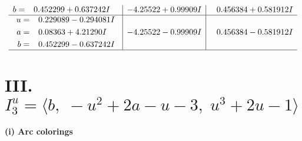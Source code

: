 \documentclass[1p]{elsarticle_modified}
\theoremstyle{definition}
\begin{document}
$$\begin{array}{c|c|c}
\begin{aligned}
b &= \phantom{-}0.452299 + 0.637242 I\end{aligned}
 & -4.25522 + 0.99909 I & \phantom{-}0.456384 + 0.581912 I \\ \hline\begin{aligned}
u &= \phantom{-}0.229089 - 0.294081 I \\
a &= \phantom{-}0.08363 + 4.21290 I \\
b &= \phantom{-}0.452299 - 0.637242 I\end{aligned}
 & -4.25522 - 0.99909 I & \phantom{-}0.456384 - 0.581912 I\\
 \hline 
 \end{array}$$\newpage\newpage\renewcommand{\arraystretch}{1}
\centering \section*{III. $I^u_{3}= \langle b,\;- u^2+2 a- u-3,\;u^3+2 u-1 \rangle$}
\flushleft \textbf{(i) Arc colorings}\\
\end{document}
